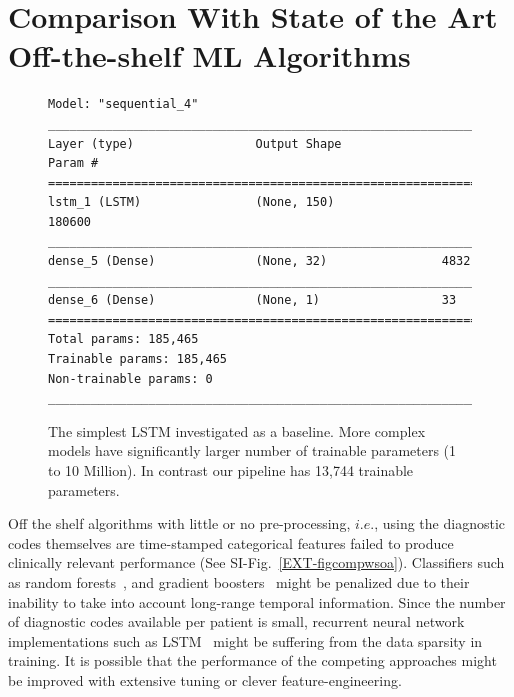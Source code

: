 \documentclass[onecolumn,,10pt]{IEEEtran}
\renewcommand{\captionN}[1]{\caption{\color{black} \sffamily \fontsize{9}{10}\selectfont #1  }}
\begin{document}
\section{Comparison With State of the Art Off-the-shelf ML Algorithms}\label{sec:offtheshelf}
 {\NCOL \begin{figure}[!ht]
    \begin{verbatim}
Model: "sequential_4"
_________________________________________________________________
Layer (type)                 Output Shape              Param #   
=================================================================
lstm_1 (LSTM)                (None, 150)               180600    
_________________________________________________________________
dense_5 (Dense)              (None, 32)                4832      
_________________________________________________________________
dense_6 (Dense)              (None, 1)                 33        
=================================================================
Total params: 185,465
Trainable params: 185,465
Non-trainable params: 0
_________________________________________________________________
\end{verbatim}
    \captionN{\HCOL The simplest LSTM investigated as a baseline. More complex models have significantly larger number of trainable parameters (1 to 10 Million). In contrast our pipeline has 13,744 trainable parameters.}\label{figlstmex}
\end{figure}
}

Off the shelf algorithms with little or no pre-processing, $i.e.$, using the diagnostic codes themselves are time-stamped categorical features failed to produce clinically relevant performance (See SI-Fig.~\ref{EXT-figcompwsoa}). Classifiers such as random forests~\cite{breiman}, and gradient boosters~\cite{friedman} might be penalized due to their inability to take into account long-range temporal information. Since the number of diagnostic codes available per patient is small, recurrent neural network implementations such as LSTM~\cite{hochreiter} might be suffering from the data sparsity in training. It is possible that the performance of the competing approaches might be improved with extensive tuning or clever feature-engineering.
\end{document}
